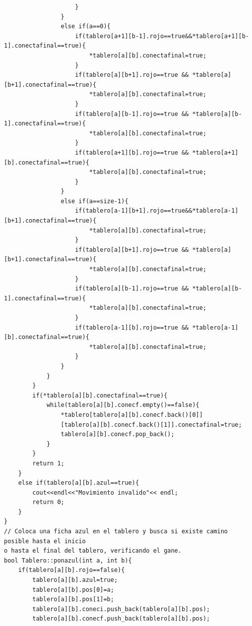 \documentclass[12pt,letterpaper]{article}
\begin{document}
\begin{lstlisting}
					}
				}
				else if(a==0){
					if(tablero[a+1][b-1].rojo==true&&*tablero[a+1][b-1].conectafinal==true){
						*tablero[a][b].conectafinal=true;
					}
					if(tablero[a][b+1].rojo==true && *tablero[a][b+1].conectafinal==true){
						*tablero[a][b].conectafinal=true;
					}
					if(tablero[a][b-1].rojo==true && *tablero[a][b-1].conectafinal==true){
						*tablero[a][b].conectafinal=true;
					}
					if(tablero[a+1][b].rojo==true && *tablero[a+1][b].conectafinal==true){
						*tablero[a][b].conectafinal=true;
					}
				}
				else if(a==size-1){
					if(tablero[a-1][b+1].rojo==true&&*tablero[a-1][b+1].conectafinal==true){
						*tablero[a][b].conectafinal=true;
					}
					if(tablero[a][b+1].rojo==true && *tablero[a][b+1].conectafinal==true){
						*tablero[a][b].conectafinal=true;
					}
					if(tablero[a][b-1].rojo==true && *tablero[a][b-1].conectafinal==true){
						*tablero[a][b].conectafinal=true;
					}
					if(tablero[a-1][b].rojo==true && *tablero[a-1][b].conectafinal==true){
						*tablero[a][b].conectafinal=true;
					}
				}
			}
		}
		if(*tablero[a][b].conectafinal==true){
			while(tablero[a][b].conecf.empty()==false){
				*tablero[tablero[a][b].conecf.back()[0]]
                [tablero[a][b].conecf.back()[1]].conectafinal=true;
				tablero[a][b].conecf.pop_back();
			}
		}
		return 1;
	}
	else if(tablero[a][b].azul==true){
		cout<<endl<<"Movimiento invalido"<< endl;
		return 0;
	}
}   
// Coloca una ficha azul en el tablero y busca si existe camino posible hasta el inicio
o hasta el final del tablero, verificando el gane.
bool Tablero::ponazul(int a, int b){
	if(tablero[a][b].rojo==false){
		tablero[a][b].azul=true;
		tablero[a][b].pos[0]=a;
		tablero[a][b].pos[1]=b;
		tablero[a][b].coneci.push_back(tablero[a][b].pos);
		tablero[a][b].conecf.push_back(tablero[a][b].pos);
		

\end{lstlisting}
\end{document}
